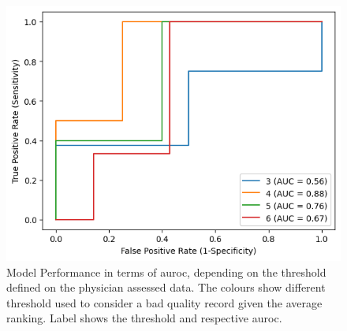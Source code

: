 \begin{figure}[htbp]
    \centering
    \caption{Model Performance in terms of \ac{auroc}, depending on the threshold defined on the physician assessed data. The colours show different threshold used to consider a bad quality record given the average ranking. Label shows the threshold and respective \ac{auroc}.}\label{fig:auc_changes} 
    \includegraphics[scale=0.78]{figures/auroc_curve_threshold.png}
    \end{figure}
